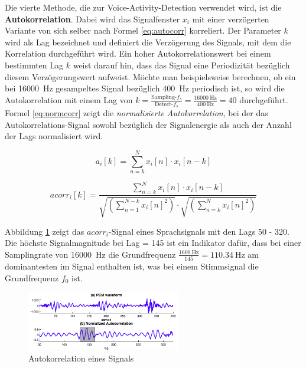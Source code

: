 Die vierte Methode, die zur Voice-Activity-Detection verwendet wird, ist die \textbf{Autokorrelation}. Dabei wird das Signalfenster $x_i$ mit einer verzögerten Variante von sich selber nach Formel \ref{eq:autocorr} korreliert. Der Parameter $k$ wird als Lag bezeichnet und definiert die Verzögerung des Signals, mit dem die Korrelation durchgeführt wird. Ein hoher Autokorrelationswert bei einem bestimmten Lag $k$ weist darauf hin, dass das Signal eine Periodizität bezüglich diesem Verzögerungswert aufweist. Möchte man beispielsweise berechnen, ob ein bei \SI{16000}{\hertz} gesampeltes Signal bezüglich \SI{400}{\hertz} periodisch ist, so wird die Autokorrelation mit einem Lag von $k = \frac{ \text{Sampling-}f_s}{\text{Detect-}f_s}=\frac{\SI{16000}{\hertz}}{\SI{400}{\hertz}} = 40 $ durchgeführt. Formel \ref{eq:normcorr} zeigt die \emph{normalisierte Autokorrelation}, bei der das Autokorrelations-Signal sowohl bezüglich der Signalenergie als auch der Anzahl der Lags normalisiert wird.

\begin{equation}
a_i[k] = \sum_{n=k}^{N}x_i[n] \cdot x_i[n-k]
\label{eq:autocorr}
\end{equation}

\begin{equation}
acorr_i[k] = \frac{\sum_{n=k}^{N}x_i[n] \cdot x_i[n-k]}{\sqrt{(\sum_{n=1}^{N-k}x_i[n]^2)} \cdot\sqrt{(\sum_{n=k}^{N}x_i[n]^2)}}
\label{eq:normcorr}
\end{equation}

Abbildung \ref{img:acorr} zeigt das $acorr_i$-Signal eines Sprachsignals mit den Lags 50 - 320. Die höchste Signalmagnitude bei Lag = 145 ist ein Indikator dafür, dass bei einer Samplingrate von \SI{16000}{\hertz} die Grundfrequenz $\frac{\SI{1600}{\hertz}}{145} = \SI{110,34}{\hertz}$ am dominantesten im Signal enthalten ist, was bei einem Stimmsignal die Grundfrequenz $f_{0}$ ist.

\begin{figure}[h]
	\centering
	\includegraphics[width=0.6\textwidth]{bilder/acorr.png}
	\caption{Autokorrelation eines Signals}
	\label{img:acorr}
\end{figure}

